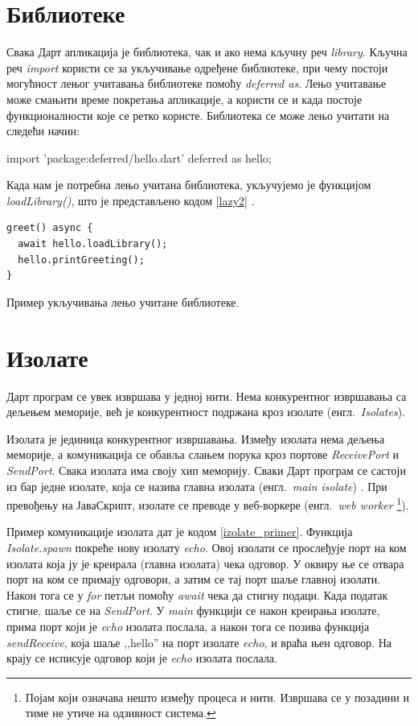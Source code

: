\documentclass[12pt,oneside]{memoir}
\begin{document}
\section{Библиотеке}
\label{dart_biblioteke}
Свака Дарт апликација је библиотека, чак и ако нема кључну реч \textit{library}. Кључна реч \textit{import} користи се за укључивање одређене библиотеке, при чему постоји могућност лењог учитавања библиотеке помоћу \textit{deferred as}. Лењо учитавање може смањити време покретања апликације, а користи се и када постоје функционалности које се ретко користе. Библиотека се може лењо учитати на следећи начин: 

import 'package:deferred/hello.dart' deferred as hello;

Када нам је потребна лењо учитана библиотека, укључујемо је функцијом \textit{loadLibrary()}, што је представљено кодом \ref{lazy2} \cite{dart, dart1}.

\begin{listing}
\begin{verbatim}
greet() async {
  await hello.loadLibrary();
  hello.printGreeting();
}
\end{verbatim}
\caption{Пример укључивања лењо учитане библиотеке.}
\label{lazy2}
\end{listing}



\section{Изолате}
\label{dart_izolate}
Дарт програм се увек извршава у једној нити. Нема конкурентног извршавања са дељењем меморије, већ је конкурентност подржана кроз изолате (енгл.~\textit{Isolates}).

Изолата је јединица конкурентног извршавања. Између изолата нема дељења меморије, а комуникација се обавља слањем порука кроз портове \textit{Receive\-Port} и \textit{SendPort}. Свака изолата има своју хип меморију. Сваки Дарт програм се састоји из бар једне изолате, која се назива главна изолата (енгл.~\textit{main isolate}) \cite{dart, dart1}. При превођењу на ЈаваСкрипт, изолате се преводе у веб-воркере (енгл.~\textit{web worker} \footnote{Појам који означава нешто између процеса и нити. Извршава се у позадини и тиме не утиче на одзивност система.}).

Пример комуникације изолата дат је кодом \ref{izolate_primer}. Функција \textit{Isolate.spawn} покреће нову изолату \textit{echo}. Овој изолати се прослеђује порт на ком изолата која ју је креирала (главна изолата) чека одговор. У оквиру ње се отвара порт на ком се примају одговори, а затим се тај порт шаље главној изолати. Након тога се у \textit{for} петљи помоћу \textit{await} чека да стигну подаци. Када податак стигне, шаље се на \textit{SendPort}. У \textit{main} функцији се након креирања изолате, прима порт који је \textit{echo} изолата послала, а након тога се позива функција \textit{sendReceive}, која шаље ,,hello'' на порт изолате \textit{echo}, и враћа њен одговор. На крају се исписује одговор који је \textit{echo} изолата послала.
\end{document}
